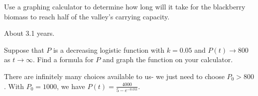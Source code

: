 \begin{exercises}
\begin{problem}
\begin{subproblem}
	Use a graphing calculator to determine how long will it take for the blackberry biomass to reach half of the valley's carrying capacity.  
	\begin{shortsolution}
		About 3.1 years.
	\end{shortsolution}
\end{subproblem}
\end{problem}
\begin{problem}
\begin{subproblem}
	Suppose that $P$ is a decreasing logistic function with $k=0.05$ and $P(t)\to 800$ as $t\to\infty$. 
	Find a formula for $P$ and graph the function on your calculator.
	\begin{shortsolution}
		There are infinitely many choices available to us- we just need to choose $P_0>800$. With $P_0=1000$, we have 
		$P(t)=\frac{4000}{5-e^{-0.05t}}$.
																			

\end{shortsolution}
\end{subproblem}
\end{problem}
\end{exercises}
